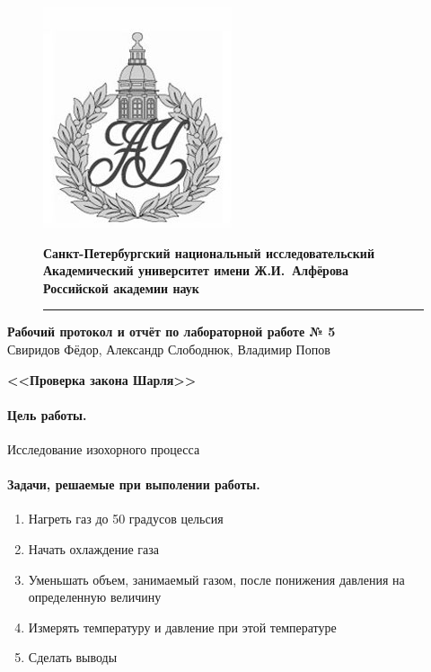 \documentclass{article}
\begin{document}
	\begin{figure}[htb]
		\begin{minipage}[c]{0.12\textwidth}
			\includegraphics[scale=0.25]{AU}
		\end{minipage}
\hfill
		\begin{minipage}[t]{0.9\textwidth}
			{\Large\bfseries Санкт-Петербургский национальный исследовательский Академический университет имени Ж.И.~Алфёрова\\Российской академии наук}
		\end{minipage}
	\rule{164mm}{0.3mm}
	\end{figure}

	\begin{center}
		{\large\textbf{Рабочий протокол и отчёт по лабораторной работе № 5}}\\
		Свиридов Фёдор, Александр Слободнюк, Владимир Попов
	\end{center}
	\begin{center}
	\Large\bfseries{<<Проверка закона Шарля>>}\\
	\end{center}
	\paragraph{Цель работы.} Исследование изохорного процесса
	\paragraph{Задачи, решаемые при выполении работы.}
	\begin{enumerate}
		\item Нагреть газ до 50 градусов цельсия
		\item Начать охлаждение газа
		\item Уменьшать объем, занимаемый газом, после понижения давления на определенную величину
		\item Измерять температуру и давление при этой температуре
		\item Сделать выводы
	\end{enumerate}
\end{document}

